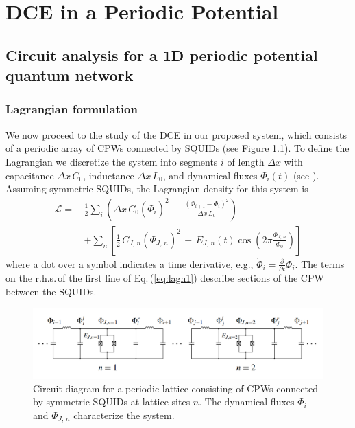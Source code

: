  \chapter{DCE in a Periodic Potential} \label{ch:system}


\section{Circuit analysis for a 1D periodic potential quantum network}\label{sec:circ_an}


\subsection{Lagrangian formulation}
\noindent
We now proceed to the study of the DCE in our proposed system, which consists of a periodic array of CPWs connected by SQUIDs (see Figure \ref{fig:circuit_diagram}). To define the Lagrangian we discretize the system into 
segments $i$ of length $\Delta x$ with capacitance $\Delta x \, C_0$, inductance $\Delta x \, L_0$, and dynamical fluxes $\Phi_i(t)$ 
(see \cite{Vool2017}).
Assuming symmetric SQUIDs, the Lagrangian density for this system is 
%
\begin{equation} \label{eq:lagn1}
\begin{split}
\mathcal{L} = \, & \frac{1}{2} \sum_i \left( \Delta x \, C_{0} \left(\dot{\Phi}_{i}\right)^{2} \, - \, 
\frac{\left(\Phi_{i+1}-\Phi_{i}\right)^{2}}{\Delta x \, L_{0}} \right)  \\[2mm]
& + \sum_n \left[ \frac{1}{2} \, C_{J,\,n} \left(\dot{\Phi}_{J,\,n} \right)^{2} \, + \, 
E_{J,\,n}(t) \cos\left(2\pi \frac{\Phi_{J,\,n}}{\Phi_0} \right) \right]
\end{split}
\end{equation}
where a dot over a symbol indicates a time derivative, e.g., 
$\displaystyle \dot{\Phi}_i = \frac{\partial}{\partial t} \Phi_i$.
The terms on the r.h.s.\,of the first line of Eq.\,(\ref{eq:lagn1}) describe sections of the CPW between the SQUIDs. %
%
\begin{figure}
    \includegraphics[width=\textwidth, keepaspectratio]{figures/system/circuit_diagram.png}
    \caption{Circuit diagram for a periodic lattice consisting of CPWs connected by symmetric SQUIDs at lattice sites $n$. 
    The dynamical fluxes $\Phi_i$ and $\Phi_{J,\,n}$ characterize the system.}
    \label{fig:circuit_diagram}
\end{figure}
